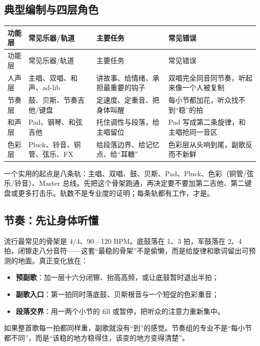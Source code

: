 \subsection{典型编制与四层角色}
\label{sec:pop-instrumentation}

\begin{longtable}{p{}p{}p{}p{}}
\toprule
功能层 & 常见乐器/轨道 & 主要任务 & 常见错误 \\
\midrule
\endfirsthead
\toprule
功能层 & 常见乐器/轨道 & 主要任务 & 常见错误 \\
\midrule
\endhead
人声层 & 主唱、双唱、和声、ad-lib & 讲故事、给情绪、承担最重要的钩子 & 双唱完全同音同节奏，听起来像一个人被复制 \\
节奏层 & 鼓、贝斯、节奏吉他/键盘 & 定速度、定重音、把身体叫醒 & 每小节都加花，听众找不到“稳”的拍 \\
和声层 & Pad、钢琴、和弦吉他 & 托住调性与段落，给主唱留位 & Pad 写成第二条旋律，和主唱抢同一音区 \\
色彩层 & Pluck、铃音、铜管、弦乐、FX & 给段落边界、给记忆点、给“耳糖” & 色彩层从头响到尾，副歌反而不新鲜 \\
\bottomrule
\end{longtable}

一个实用的起点是八条轨：主唱、双唱、鼓、贝斯、Pad、Pluck、色彩（铜管/弦乐/铃音）、Master 总线。先把这个骨架跑通，再决定要不要加第二吉他、第二键盘或更多打击乐。轨数不是专业度的证明；每条轨都有工作，才是。

\subsection{节奏：先让身体听懂}
\label{sec:pop-groove}

流行最常见的骨架是 4/4、90—120 BPM。底鼓落在 1、3 拍，军鼓落在 2、4 拍，闭镲走八分音符——这套“最稳的骨架”不是偷懒，而是给旋律和歌词留出可预测的地面。真正变化放在：

\begin{itemize}
\item \textbf{预副歌}：加一层十六分闭镲、抬高高频，或让底鼓暂时退出半拍；
\item \textbf{副歌入口}：第一拍同时落底鼓、贝斯根音与一个短促的色彩重音；
\item \textbf{段落交界}：用一两个小节的 fill 或暂停，把听众的注意力重新集中。
\end{itemize}

如果整首歌每一拍都同样重，副歌就没有“到”的感觉。节奏组的专业不是“每小节都不同”，而是“该稳的地方稳得住，该变的地方变得清楚”。

